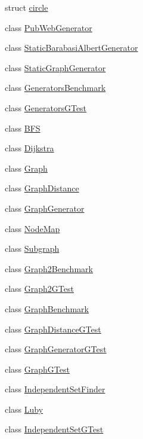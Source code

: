\begin{DoxyCompactItemize}
\item 
struct \hyperlink{struct_networ_kit_1_1circle}{circle}
\item 
class \hyperlink{class_networ_kit_1_1_pub_web_generator}{Pub\-Web\-Generator}
\item 
class \hyperlink{class_networ_kit_1_1_static_barabasi_albert_generator}{Static\-Barabasi\-Albert\-Generator}
\item 
class \hyperlink{class_networ_kit_1_1_static_graph_generator}{Static\-Graph\-Generator}
\item 
class \hyperlink{class_networ_kit_1_1_generators_benchmark}{Generators\-Benchmark}
\item 
class \hyperlink{class_networ_kit_1_1_generators_g_test}{Generators\-G\-Test}
\item 
class \hyperlink{class_networ_kit_1_1_b_f_s}{B\-F\-S}
\item 
class \hyperlink{class_networ_kit_1_1_dijkstra}{Dijkstra}
\item 
class \hyperlink{class_networ_kit_1_1_graph}{Graph}
\item 
class \hyperlink{class_networ_kit_1_1_graph_distance}{Graph\-Distance}
\item 
class \hyperlink{class_networ_kit_1_1_graph_generator}{Graph\-Generator}
\item 
class \hyperlink{class_networ_kit_1_1_node_map}{Node\-Map}
\item 
class \hyperlink{class_networ_kit_1_1_subgraph}{Subgraph}
\item 
class \hyperlink{class_networ_kit_1_1_graph2_benchmark}{Graph2\-Benchmark}
\item 
class \hyperlink{class_networ_kit_1_1_graph2_g_test}{Graph2\-G\-Test}
\item 
class \hyperlink{class_networ_kit_1_1_graph_benchmark}{Graph\-Benchmark}
\item 
class \hyperlink{class_networ_kit_1_1_graph_distance_g_test}{Graph\-Distance\-G\-Test}
\item 
class \hyperlink{class_networ_kit_1_1_graph_generator_g_test}{Graph\-Generator\-G\-Test}
\item 
class \hyperlink{class_networ_kit_1_1_graph_g_test}{Graph\-G\-Test}
\item 
class \hyperlink{class_networ_kit_1_1_independent_set_finder}{Independent\-Set\-Finder}
\item 
class \hyperlink{class_networ_kit_1_1_luby}{Luby}
\item 
class \hyperlink{class_networ_kit_1_1_independent_set_g_test}{Independent\-Set\-G\-Test}

\end{DoxyCompactItemize}
